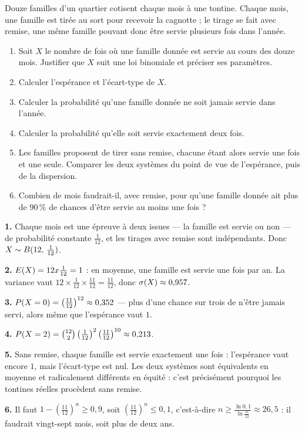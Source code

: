 \begin{jecherche}
Douze familles d'un quartier cotisent chaque mois à une tontine. Chaque mois,
une famille est tirée au sort pour recevoir la cagnotte ; le tirage se fait
avec remise, une même famille pouvant donc être servie plusieurs fois dans
l'année.

\begin{enumerate}[label=\textbf{\arabic*.}, leftmargin=*, itemsep=0.3em]
  \item Soit $X$ le nombre de fois où une famille donnée est servie au cours
        des douze mois. Justifier que $X$ suit une loi binomiale et préciser
        ses paramètres.
  \item Calculer l'espérance et l'écart-type de $X$.
  \item Calculer la probabilité qu'une famille donnée ne soit jamais servie
        dans l'année.
  \item Calculer la probabilité qu'elle soit servie exactement deux fois.
  \item Les familles proposent de tirer sans remise, chacune étant alors
        servie une fois et une seule. Comparer les deux systèmes du point de
        vue de l'espérance, puis de la dispersion.
  \item Combien de mois faudrait-il, avec remise, pour qu'une famille donnée
        ait plus de $90\,\%$ de chances d'être servie au moins une fois ?
\end{enumerate}
\end{jecherche}

\begin{corrige}
\textbf{1.} Chaque mois est une épreuve à deux issues — la famille est servie
ou non — de probabilité constante $\frac{1}{12}$, et les tirages avec remise
sont indépendants. Donc $X \sim \loibin{12}{\frac{1}{12}}$.

\textbf{2.} $\Esp(X) = 12 \times \frac{1}{12} = 1$ : en moyenne, une famille
est servie une fois par an. La variance vaut
$12 \times \frac{1}{12} \times \frac{11}{12} = \frac{11}{12}$, donc
$\ecart(X) \approx 0{,}957$.

\textbf{3.} $\proba{X = 0} = \left(\frac{11}{12}\right)^{12} \approx 0{,}352$
— plus d'une chance sur trois de n'être jamais servi, alors même que
l'espérance vaut $1$.

\textbf{4.} $\proba{X = 2} = \combi{2}{12}\left(\frac{1}{12}\right)^{2}
\left(\frac{11}{12}\right)^{10} \approx 0{,}213$.

\textbf{5.} Sans remise, chaque famille est servie exactement une fois :
l'espérance vaut encore $1$, mais l'écart-type est nul. Les deux systèmes
sont équivalents en moyenne et radicalement différents en équité : c'est
précisément pourquoi les tontines réelles procèdent sans remise.

\textbf{6.} Il faut $1-\left(\frac{11}{12}\right)^{n} \geq 0{,}9$, soit
$\left(\frac{11}{12}\right)^{n} \leq 0{,}1$, c'est-à-dire
$n \geq \frac{\ln 0{,}1}{\ln\frac{11}{12}} \approx 26{,}5$ : il faudrait
vingt-sept mois, soit plus de deux ans.
\end{corrige}

